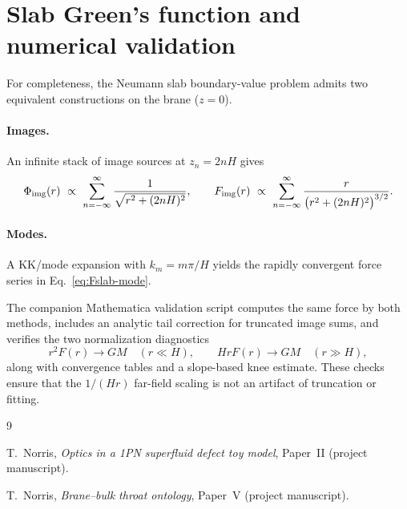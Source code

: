 \documentclass[12pt]{article}
\begin{document}
\appendix

\section{Slab Green's function and numerical validation}
\label{app:slab-validation}

For completeness, the Neumann slab boundary-value problem admits two equivalent constructions on the brane ($z=0$).

\paragraph{Images.}
An infinite stack of image sources at $z_n=2nH$ gives
\begin{equation}
  \Phi_{\rm img}(r)\ \propto\ \sum_{n=-\infty}^{\infty}\frac{1}{\sqrt{r^2+(2nH)^2}},
  \qquad
  F_{\rm img}(r)\ \propto\ \sum_{n=-\infty}^{\infty}\frac{r}{\bigl(r^2+(2nH)^2\bigr)^{3/2}}.
\end{equation}

\paragraph{Modes.}
A KK/mode expansion with $k_m=m\pi/H$ yields the rapidly convergent force series in Eq.~\eqref{eq:Fslab-mode}.

The companion Mathematica validation script computes the same force by both methods, includes an analytic tail correction for truncated image sums, and verifies the two normalization diagnostics
\begin{equation}
  r^2 F(r)\to GM\quad(r\ll H),
  \qquad
  HrF(r)\to GM\quad(r\gg H),
\end{equation}
along with convergence tables and a slope-based knee estimate. These checks ensure that the $1/(Hr)$ far-field scaling is not an artifact of truncation or fitting.

\begin{thebibliography}{9}

T.~Norris, \emph{Optics in a 1PN superfluid defect toy model}, Paper~II (project manuscript).

T.~Norris, \emph{Brane--bulk throat ontology}, Paper~V (project manuscript).

\end{thebibliography}
\end{document}
